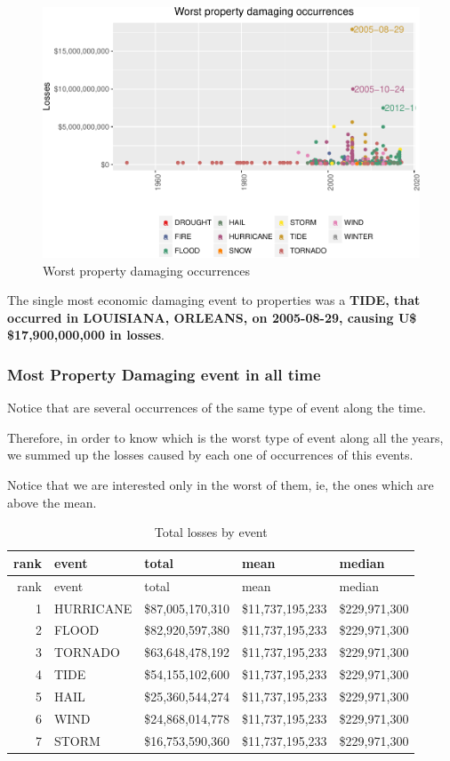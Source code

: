 \documentclass[]{article}
\begin{document}
\begin{figure}[htbp]
\centering
\includegraphics{readme_files/figure-latex/prop-single-plot-1.pdf}
\caption{Worst property damaging occurrences}
\end{figure}

The single most economic damaging event to properties was a
\textbf{TIDE, that occurred in LOUISIANA, ORLEANS, on 2005-08-29,
causing U\$ \$17,900,000,000 in losses}.

\subsubsection{Most Property Damaging event in all
time}\label{most-property-damaging-event-in-all-time}

Notice that are several occurrences of the same type of event along the
time.

Therefore, in order to know which is the worst type of event along all
the years, we summed up the losses caused by each one of occurrences of
this events.

Notice that we are interested only in the worst of them, ie, the ones
which are above the mean.

\begin{longtable}[]{@{}rllll@{}}
\caption{Total losses by event}\tabularnewline
\toprule
rank & event & total & mean & median\tabularnewline
\midrule
\endfirsthead
\toprule
rank & event & total & mean & median\tabularnewline
\midrule
\endhead
1 & HURRICANE & \$87,005,170,310 & \$11,737,195,233 &
\$229,971,300\tabularnewline
2 & FLOOD & \$82,920,597,380 & \$11,737,195,233 &
\$229,971,300\tabularnewline
3 & TORNADO & \$63,648,478,192 & \$11,737,195,233 &
\$229,971,300\tabularnewline
4 & TIDE & \$54,155,102,600 & \$11,737,195,233 &
\$229,971,300\tabularnewline
5 & HAIL & \$25,360,544,274 & \$11,737,195,233 &
\$229,971,300\tabularnewline
6 & WIND & \$24,868,014,778 & \$11,737,195,233 &
\$229,971,300\tabularnewline
7 & STORM & \$16,753,590,360 & \$11,737,195,233 &
\$229,971,300\tabularnewline
\bottomrule
\end{longtable}
\end{document}
